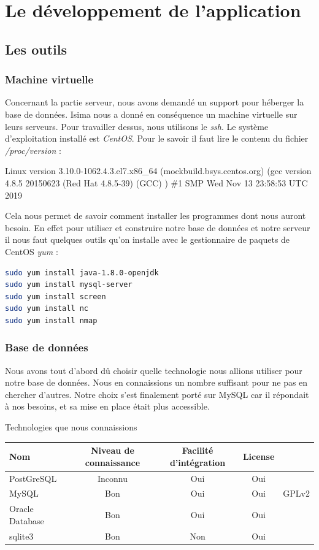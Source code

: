 
\section{Le développement de l'application}
\subsection{Les outils}
\subsubsection{Machine virtuelle}
Concernant la partie serveur, nous avons demandé un support pour héberger la base de données. Isima nous a donné en conséquence un machine
virtuelle sur leurs serveurs. Pour travailler dessus, nous utilisons le \emph{ssh}. Le système d'exploitation installé est \emph{CentOS}.
Pour le savoir il faut lire le contenu du fichier \emph{/proc/version} :
\begin{mdframed}[backgroundcolor=light-gray, roundcorner=20pt,
    leftmargin=0, rightmargin=0, 
    innerleftmargin=20, linecolor=darkgray]
    Linux version 3.10.0-1062.4.3.el7.x86\_64 (mockbuild\@kbuilder.bsys.centos.org) (gcc version 4.8.5 20150623 (Red Hat 4.8.5-39) (GCC) ) \#1 SMP Wed Nov 13 23:58:53 UTC 2019
\end{mdframed}

Cela nous permet de savoir comment installer les programmes dont nous auront besoin. En effet pour utiliser et construire notre base de données
et notre serveur il nous faut quelques outils qu'on installe avec le gestionnaire de paquets de CentOS \emph{yum} :
\begin{lstlisting}[language=bash]
sudo yum install java-1.8.0-openjdk
sudo yum install mysql-server
sudo yum install screen
sudo yum install nc
sudo yum install nmap
\end{lstlisting}

\subsubsection{Base de données}
Nous avons tout d'abord dû choisir quelle technologie nous allions utiliser pour notre base de données.
Nous en connaissions un nombre suffisant pour ne pas en chercher d'autres. Notre choix s'est finalement porté sur MySQL car il répondait à nos besoins, et sa mise en place était plus accessible.
\par
\begin{center}
    Technologies que nous connaissions
    \par
    \begin{tabular}{|l|c|c|c|c|}
        \hline
        Nom & Niveau de connaissance & Facilité d'intégration & License & \\
        \hline
        PostGreSQL & Inconnu & Oui & Oui &\\
        \hline
        MySQL & Bon & Oui & Oui & GPLv2\\
        \hline
        Oracle Database & Bon & Oui & Oui & \\
        \hline
        sqlite3 & Bon & Non & Oui & \\
        \hline
    \end{tabular}
\end{center}

